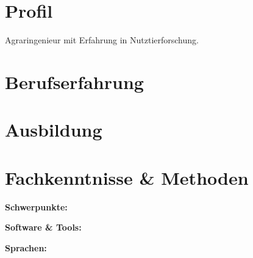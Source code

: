\documentclass[10pt,a4paper]{article}
\begin{document}

\section*{Profil}
Agraringenieur mit Erfahrung in Nutztierforschung.

\section*{Berufserfahrung}


\section*{Ausbildung}


\section*{Fachkenntnisse \& Methoden}
\textbf{Schwerpunkte:} \par

\textbf{Software \& Tools:} \par
\textbf{Sprachen:} 
\end{document}
